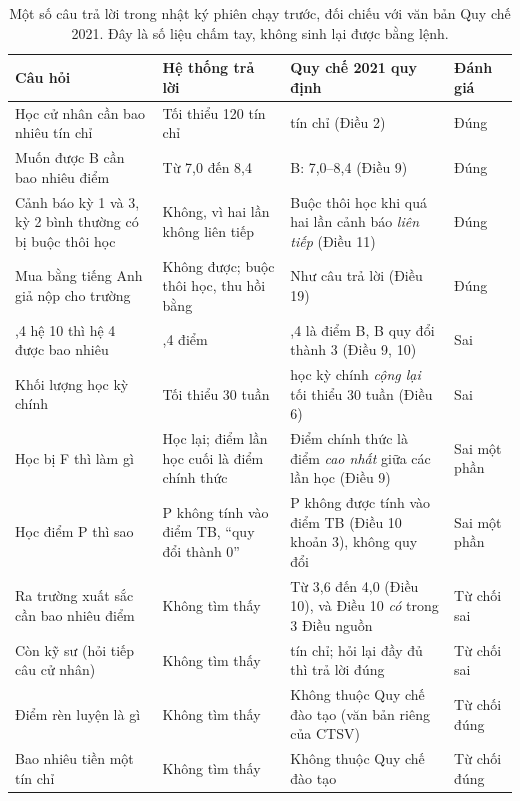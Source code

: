 \begin{table}[H]
  \centering
  \small
  \begin{tabularx}{\textwidth}{>{\hsize=0.95\hsize}X >{\hsize=0.95\hsize}X >{\hsize=1.1\hsize}X l}
    \toprule
    \textbf{Câu hỏi} & \textbf{Hệ thống trả lời} & \textbf{Quy chế 2021 quy định} & \textbf{Đánh giá} \\
    \midrule
    Học cử nhân cần bao nhiêu tín chỉ & Tối thiểu 120 tín chỉ & 120 tín chỉ (Điều 2) & Đúng \\
    Muốn được B cần bao nhiêu điểm & Từ 7,0 đến 8,4 & B: 7,0--8,4 (Điều 9) & Đúng \\
    Cảnh báo kỳ 1 và 3, kỳ 2 bình thường có bị buộc thôi học & Không, vì hai lần không liên tiếp & Buộc thôi học khi quá hai lần cảnh báo \emph{liên tiếp} (Điều 11) & Đúng \\
    Mua bằng tiếng Anh giả nộp cho trường & Không được; buộc thôi học, thu hồi bằng & Như câu trả lời (Điều 19) & Đúng \\
    \midrule
    8,4 hệ 10 thì hệ 4 được bao nhiêu & 3,4 điểm & 8,4 là điểm B, B quy đổi thành 3 (Điều 9, 10) & Sai \\
    Khối lượng học kỳ chính & Tối thiểu 30 tuần & 2 học kỳ chính \emph{cộng lại} tối thiểu 30 tuần (Điều 6) & Sai \\
    Học bị F thì làm gì & Học lại; điểm lần học cuối là điểm chính thức & Điểm chính thức là điểm \emph{cao nhất} giữa các lần học (Điều 9) & Sai một phần \\
    Học điểm P thì sao & P không tính vào điểm TB, ``quy đổi thành 0'' & P không được tính vào điểm TB (Điều 10 khoản 3), không quy đổi & Sai một phần \\
    \midrule
    Ra trường xuất sắc cần bao nhiêu điểm & Không tìm thấy & Từ 3,6 đến 4,0 (Điều 10), và Điều 10 \emph{có} trong 3 Điều nguồn & Từ chối sai \\
    Còn kỹ sư (hỏi tiếp câu cử nhân) & Không tìm thấy & 150 tín chỉ; hỏi lại đầy đủ thì trả lời đúng & Từ chối sai \\
    \midrule
    Điểm rèn luyện là gì & Không tìm thấy & Không thuộc Quy chế đào tạo (văn bản riêng của CTSV) & Từ chối đúng \\
    Bao nhiêu tiền một tín chỉ & Không tìm thấy & Không thuộc Quy chế đào tạo & Từ chối đúng \\
    \bottomrule
  \end{tabularx}
  \caption{Một số câu trả lời trong nhật ký phiên chạy trước, đối chiếu với văn bản Quy chế 2021.
  Đây là số liệu chấm tay, không sinh lại được bằng lệnh.}
  \label{tab:tra-loi}
\end{table}

